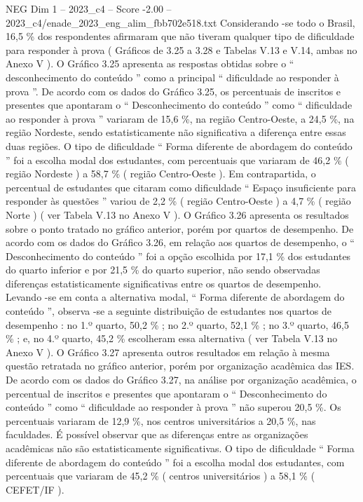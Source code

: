 \begin{textsample}{NEG Dim 1 – 2023\_c4 – Score -2.00 – 2023\_c4/enade\_2023\_eng\_alim\_fbb702e518.txt}
Considerando -se todo o Brasil, 16,5 \% dos respondentes afirmaram que não tiveram qualquer tipo de dificuldade para responder à prova ( Gráficos de 3.25 a 3.28 e Tabelas V.13 e V.14, ambas no Anexo V ).
O Gráfico 3.25 apresenta as respostas obtidas sobre o “ desconhecimento do conteúdo ” como a principal “ dificuldade ao responder à prova ”.
De acordo com os dados do Gráfico 3.25, os percentuais de inscritos e presentes que apontaram o “ Desconhecimento do conteúdo ” como “ dificuldade ao responder à prova ” variaram de 15,6 \%, na região Centro-Oeste, a 24,5 \%, na região Nordeste, sendo estatisticamente não significativa a diferença entre essas duas regiões.
O tipo de dificuldade “ Forma diferente de abordagem do conteúdo ” foi a escolha modal dos estudantes, com percentuais que variaram de 46,2 \% ( região Nordeste ) a 58,7 \% ( região Centro-Oeste ).
Em contrapartida, o percentual de estudantes que citaram como dificuldade “ Espaço insuficiente para responder às questões ” variou de 2,2 \% ( região Centro-Oeste ) a 4,7 \% ( região Norte ) ( ver Tabela V.13 no Anexo V ).
O Gráfico 3.26 apresenta os resultados sobre o ponto tratado no gráfico anterior, porém por quartos de desempenho.
De acordo com os dados do Gráfico 3.26, em relação aos quartos de desempenho, o “ Desconhecimento do conteúdo ” foi a opção escolhida por 17,1 \% dos estudantes do quarto inferior e por 21,5 \% do quarto superior, não sendo observadas diferenças estatisticamente significativas entre os quartos de desempenho.
Levando -se em conta a alternativa modal, “ Forma diferente de abordagem do conteúdo ”, observa -se a seguinte distribuição de estudantes nos quartos de desempenho : no 1.º quarto, 50,2 \% ; no 2.º quarto, 52,1 \% ; no 3.º quarto, 46,5 \% ; e, no 4.º quarto, 45,2 \% escolheram essa alternativa ( ver Tabela V.13 no Anexo V ).
O Gráfico 3.27 apresenta outros resultados em relação à mesma questão retratada no gráfico anterior, porém por organização acadêmica das IES.
De acordo com os dados do Gráfico 3.27, na análise por organização acadêmica, o percentual de inscritos e presentes que apontaram o “ Desconhecimento do conteúdo ” como “ dificuldade ao responder à prova ” não superou 20,5 \%.
Os percentuais variaram de 12,9 \%, nos centros universitários a 20,5 \%, nas faculdades.
É possível observar que as diferenças entre as organizações acadêmicas não são estatisticamente significativas.
O tipo de dificuldade “ Forma diferente de abordagem do conteúdo ” foi a escolha modal dos estudantes, com percentuais que variaram de 45,2 \% ( centros universitários ) a 58,1 \% ( CEFET/IF ).

\end{textsample}
